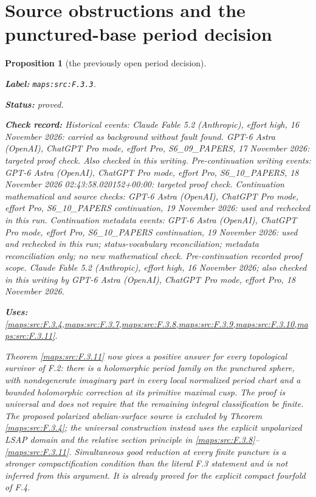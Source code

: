 \documentclass[11pt,a4paper]{article}
\newtheorem{proposition}[proposition]{Proposition}
\theoremstyle{definition}
\newcommand{\StatementRecord}[4]{\par\smallskip\begingroup\upshape\raggedright\noindent\textbf{Label:} \nolinkurl{#1}.\par\noindent\textbf{Status:} #2.\par\noindent\textbf{Check record:} #3.\par\noindent\textbf{Uses:} #4.\par\endgroup\smallskip}
\begin{document}
\section{Source obstructions and the punctured-base period decision}



\begin{proposition}[the previously open period decision]\label{maps:src:F.3.3}
\StatementRecord{maps:src:F.3.3}{proved}{Historical events: Claude Fable 5.2 (Anthropic), effort high, 16 November 2026: carried as background without fault found. GPT-6 Astra (OpenAI), ChatGPT Pro mode, effort Pro, S6\_09\_PAPERS, 17 November 2026: targeted proof check. Also checked in this writing. Pre-continuation writing events: GPT-6 Astra (OpenAI), ChatGPT Pro mode, effort Pro, S6\_10\_PAPERS, 18 November 2026 02:43:58.020152+00:00: targeted proof check. Continuation mathematical and source checks: GPT-6 Astra (OpenAI), ChatGPT Pro mode, effort Pro, S6\_10\_PAPERS continuation, 19 November 2026: used and rechecked in this run. Continuation metadata events: GPT-6 Astra (OpenAI), ChatGPT Pro mode, effort Pro, S6\_10\_PAPERS continuation, 19 November 2026: used and rechecked in this run; status-vocabulary reconciliation; metadata reconciliation only; no new mathematical check. \emph{Pre-continuation recorded proof scope.} Claude Fable 5.2 (Anthropic), effort high, 16 November 2026; also checked in this writing by GPT-6 Astra (OpenAI), ChatGPT Pro mode, effort Pro, 18 November 2026}{\cref{maps:src:F.3.4,maps:src:F.3.7,maps:src:F.3.8,maps:src:F.3.9,maps:src:F.3.10,maps:src:F.3.11}}


Theorem \ref{maps:src:F.3.11} now gives a positive answer for every topological
survivor of F.2: there is a holomorphic period family on the
punctured sphere, with nondegenerate imaginary part in every
local normalized period chart and a bounded holomorphic
correction at its primitive maximal cusp.  The proof is universal
and does not require that the remaining integral classification
be finite.  The proposed polarized abelian-surface source is
excluded by Theorem \ref{maps:src:F.3.4}; the universal construction instead
uses the explicit unpolarized LSAP domain and the relative
section principle in \ref{maps:src:F.3.8}--\ref{maps:src:F.3.11}.  Simultaneous good reduction
at every finite puncture is a stronger compactification condition
than the literal F.3 statement and is not inferred from this
argument.  It is already proved for the explicit compact
fourfold of F.4.

\end{proposition}
\end{document}

